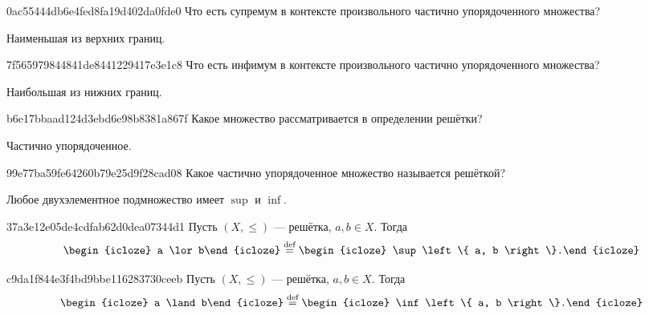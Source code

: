 \begin{note}{0ac55444db6e4fed8fa19d402da0fde0}
    Что есть супремум в контексте произвольного частично упорядоченного множества?

    \begin{cloze}{1}
        Наименьшая из верхних границ.
    \end{cloze}
\end{note}

\begin{note}{7f565979844841de8441229417e3e1c8}
    Что есть инфимум в контексте произвольного частично упорядоченного множества?

    \begin{cloze}{1}
        Наибольшая из нижних границ.
    \end{cloze}
\end{note}

\begin{note}{b6e17bbaad124d3ebd6e98b8381a867f}
    Какое множество рассматривается в определении решётки?

    \begin{cloze}{1}
        Частично упорядоченное.
    \end{cloze}
\end{note}

\begin{note}{99e77ba59fe64260b79e25d9f28cad08}
    Какое частично упорядоченное множество называется решёткой?

    \begin{cloze}{1}
        Любое двухэлементное подмножество имеет \({ \sup }\) и \({ \inf }\).
    \end{cloze}
\end{note}

\begin{note}{37a3e12e05de4cdfab62d0dea07344d1}
    Пусть \({ (X, \leqslant) }\) --- решётка, \({ a, b \in X }\).
    Тогда
    \[
        \begin{icloze}{2}a \lor b\end{icloze} \overset{\text{def}}= \begin{icloze}{1}\sup \left\{ a, b \right\}.\end{icloze}
    \]
\end{note}

\begin{note}{c9da1f844e3f4bd9bbe116283730ceeb}
    Пусть \({ (X, \leqslant) }\) --- решётка, \({ a, b \in X }\).
    Тогда
    \[
        \begin{icloze}{2}a \land b\end{icloze} \overset{\text{def}}= \begin{icloze}{1}\inf \left\{ a, b \right\}.\end{icloze}
    \]
\end{note}

